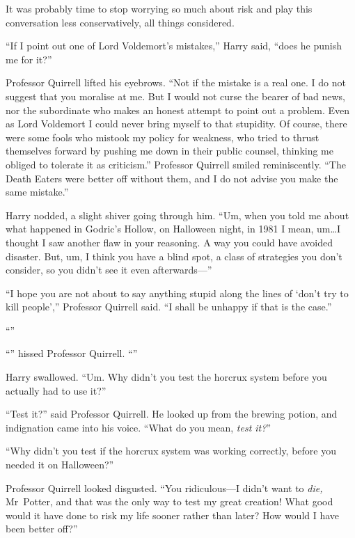It was probably time to stop worrying so much about risk and play this conversation less conservatively, all things considered.

“If I point out one of Lord Voldemort’s mistakes,” Harry said, “does he punish me for it?”

Professor Quirrell lifted his eyebrows. “Not if the mistake is a real one. I do not suggest that you moralise at me. But I would not curse the bearer of bad news, nor the subordinate who makes an honest attempt to point out a problem. Even as Lord Voldemort I could never bring myself to that stupidity. Of course, there were some fools who mistook my policy for weakness, who tried to thrust themselves forward by pushing me down in their public counsel, thinking me obliged to tolerate it as criticism.” Professor Quirrell smiled reminiscently. “The Death Eaters were better off without them, and I do not advise you make the same mistake.”

Harry nodded, a slight shiver going through him. “Um, when you told me about what happened in Godric’s Hollow, on Halloween night, in 1981 I mean, um…I thought I saw another flaw in your reasoning. A way you could have avoided disaster. But, um, I think you have a blind spot, a class of strategies you don’t consider, so you didn’t see it even afterwards—”

“I hope you are not about to say anything stupid along the lines of ‘don’t try to kill people’,” Professor Quirrell said. “I shall be unhappy if that is the case.”

“”

“” hissed Professor Quirrell. “”

Harry swallowed. “Um. Why didn’t you test the horcrux system before you actually had to use it?”

“Test it?” said Professor Quirrell. He looked up from the brewing potion, and indignation came into his voice. “What do you mean, \emph{test it?}”

“Why didn’t you test if the horcrux system was working correctly, before you needed it on Halloween?”

Professor Quirrell looked disgusted. “You ridiculous—I didn’t want to \emph{die,} Mr~Potter, and that was the only way to test my great creation! What good would it have done to risk my life sooner rather than later? How would I have been better off?”

